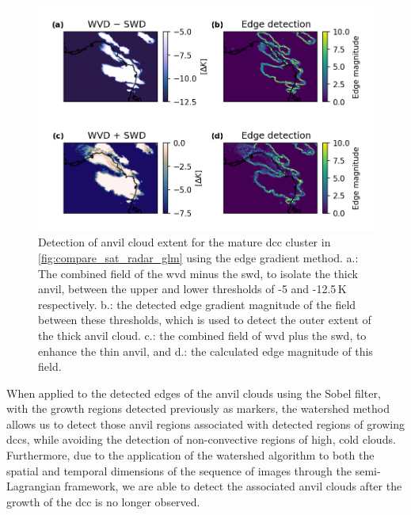 \begin{figure}[tp]
    \includegraphics[width=\textwidth]{figures/chapter1_17.png}
    \caption[
    Detection of anvil cloud extent for the mature \acrshort{dcc} cluster in \ref{fig:compare_sat_radar_glm} using the edge gradient method
    ]{
    Detection of anvil cloud extent for the mature \acrshort{dcc} cluster in \ref{fig:compare_sat_radar_glm} using the edge gradient method. a.: The combined field of the \acrshort{wvd} minus the \acrshort{swd}, to isolate the thick anvil, between the upper and lower thresholds of -5 and -12.5\,\unit{K} respectively. b.: the detected edge gradient magnitude of the field between these thresholds, which is used to detect the outer extent of the thick anvil cloud. c.: the combined field of \acrshort{wvd} plus the \acrshort{swd}, to enhance the thin anvil, and d.: the calculated edge magnitude of this field.
    }
    \label{fig:edge_detection}
\end{figure}


When applied to the detected edges of the anvil clouds using the Sobel filter, with the growth regions detected previously as markers, the watershed method allows us to detect those anvil regions associated with detected regions of growing \acrshort{dcc}s, while avoiding the detection of non-convective regions of high, cold clouds.
Furthermore, due to the application of the watershed algorithm to both the spatial and temporal dimensions of the sequence of images through the semi-Lagrangian framework, we are able to detect the associated anvil clouds after the growth of the \acrshort{dcc} is no longer observed.

